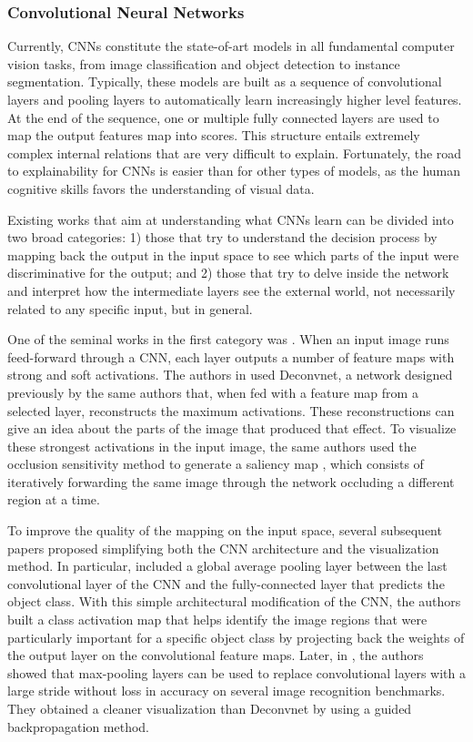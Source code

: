 \documentclass[final]{elsarticle}
\begin{document}
\subsubsection{Convolutional Neural Networks}

Currently, CNNs constitute the state-of-art models in all fundamental computer vision tasks, from image classification and object detection to instance segmentation. Typically, these models are built as a sequence of convolutional layers and pooling layers to automatically learn increasingly higher level features. At the end of the sequence, one or multiple fully connected layers are used to map the output features map into scores. This structure entails extremely complex internal relations that are very difficult to explain. Fortunately, the road to explainability for CNNs is easier than for other types of models, as the human cognitive skills favors the understanding of visual data. 
 
Existing works that aim at understanding what CNNs learn can be divided into two broad categories: 1) those that try to understand the decision process by mapping back the output in the input space to see which parts of the input were discriminative for the output; and 2) those that try to delve inside the network and interpret how the intermediate layers see the external world, not necessarily related to any specific input, but in general. 
  
One of the seminal works in the first category was \cite{AdaptiveDeconv}. When an input image runs feed-forward through a CNN, each layer outputs a number of feature maps with strong and soft activations. The authors in \cite{AdaptiveDeconv} used Deconvnet, a network designed previously by the same authors \cite{zeiler2010deconvolutional} that, when fed with a feature map from a selected layer, reconstructs the maximum activations. These reconstructions can give an idea about the parts of the image that produced that effect. To visualize these strongest activations in the input image, the same authors used the occlusion sensitivity method to generate a saliency map \cite{VisualizingUnderstanding}, which consists of iteratively forwarding the same image through the network occluding a different region at a time. 

To improve the quality of the mapping on the input space, several subsequent papers proposed simplifying both the CNN architecture and the visualization method. In particular, \cite{LearningDeepFeatures} included a global average pooling layer between the last convolutional layer of the CNN and the fully-connected layer that predicts the object class. With this simple architectural modification of the CNN, the authors built a class activation map that helps identify the image regions that were particularly important for a specific object class by projecting back the weights of the output layer on the convolutional feature maps. Later, in \cite{springenberg2014striving}, the authors showed that max-pooling layers can be used to replace convolutional layers with a large stride without loss in accuracy on several image recognition benchmarks. They obtained a cleaner visualization than Deconvnet by using a guided backpropagation method. 
\end{document}
